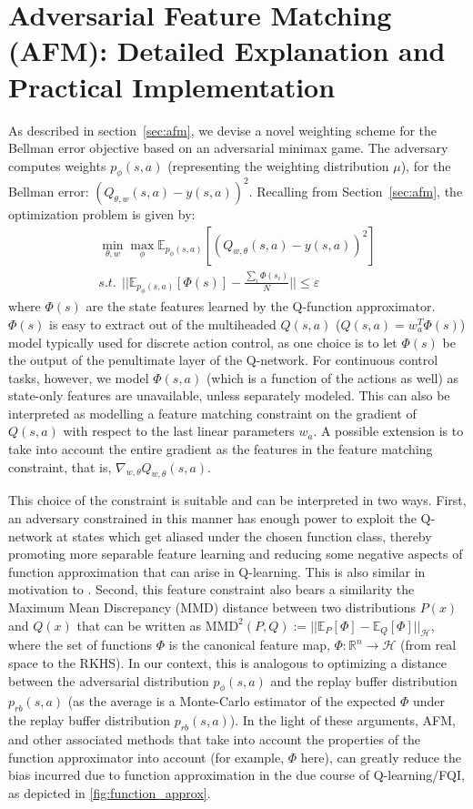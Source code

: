 \section{Adversarial Feature Matching (AFM): Detailed Explanation and Practical Implementation}
\label{app:adversarial}
As described in section~\ref{sec:afm}, we devise a novel weighting scheme for the Bellman error objective based on an adversarial minimax game. The adversary computes weights $p_\phi(s, a)$ (representing the weighting distribution $\mu$), for the Bellman error: $(Q_{\theta, w}(s, a) - y(s, a))^2$. Recalling from Section~\ref{sec:afm}, the optimization problem is given by:
\begin{multline*}
    \min_{\theta, w} \max_{\phi} \mathbb{E}_{p_\phi(s, a)} [(Q_{w, \theta} (s, a) - y(s, a))^2]\\
s.t.~~ \big\vert\big\vert \mathbb{E}_{p_\phi(s, a)}[\Phi(s)] - \frac{\sum_i \Phi(s_i)}{N} \vert\vert \leq \varepsilon
\end{multline*}
where $\Phi(s)$ are the state features learned by the Q-function approximator. $\Phi(s)$ is easy to extract out of the multiheaded $Q(s,a)$ ($Q(s, a) = w_a^T\Phi(s)$) model typically used for discrete action control, as one choice is to let $\Phi(s)$ be the output of the penultimate layer of the Q-network. For continuous control tasks, however, we model $\Phi(s, a)$ (which is a function of the actions as well) as state-only features are unavailable, unless separately modeled. This can also be interpreted as modelling a feature matching constraint on the gradient of $Q(s, a)$ with respect to the last linear parameters $w_a$. A possible extension is to take into account the entire gradient as the features in the feature matching constraint, that is, $\nabla_{w, \theta} Q_{w, \theta}(s, a)$.

This choice of the constraint is suitable and can be interpreted in two ways. First, an adversary constrained in this manner has enough power to exploit the Q-network at states which get aliased under the chosen function class, thereby promoting more separable feature learning and reducing some negative aspects of function approximation that can arise in Q-learning. This is also similar in motivation to \citep{martha2018sparse}. Second, this feature constraint also bears a similarity the Maximum Mean Discrepancy (MMD) distance between two distributions $P(x)$ and $Q(x)$ that can be written as $\text{MMD}^2(P, Q) := ||\mathbb{E}_{P}[\Phi] - \mathbb{E}_{Q}[\Phi]||_{\mathcal{H}}$, where the set of functions $\Phi$ is the canonical feature map, $\Phi: \mathbb{R}^n \rightarrow \mathcal{H}$ (from real space to the RKHS). In our context, this is analogous to optimizing a distance between the adversarial distribution $p_\phi(s, a)$ and the replay buffer distribution $p_{rb}(s, a)$ (as the average is a Monte-Carlo estimator of the expected $\Phi$ under the replay buffer distribution $p_{rb}(s, a)$). In the light of these arguments, AFM, and other associated methods that take into account the properties of the function approximator into account (for example, $\Phi$ here), can greatly reduce the bias incurred due to function approximation in the due course of Q-learning/FQI, as depicted in \ref{fig:function_approx}.

